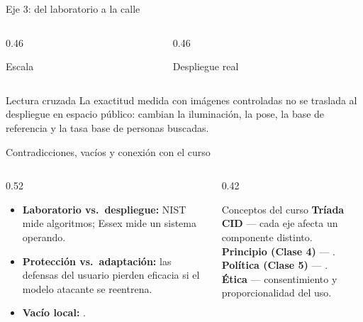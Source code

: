 \begin{frame}{Eje 3: del laboratorio a la calle}
  \begin{columns}[T]
    \begin{column}{0.46\textwidth}
      \begin{block}{Escala \cite{garvie_perpetual_2016}}
      \end{block}
    \end{column}
    \begin{column}{0.46\textwidth}
      \begin{block}{Despliegue real \cite{fussey_essex_2019}}
      \end{block}
    \end{column}
  \end{columns}

  \begin{alertblock}{Lectura cruzada}
    \scriptsize
    La exactitud medida con im\'agenes controladas no se traslada al
    despliegue en espacio p\'ublico: cambian la iluminaci\'on, la pose, la
    base de referencia y la tasa base de personas buscadas.
  \end{alertblock}
\end{frame}

\begin{frame}{Contradicciones, vac\'ios y conexi\'on con el curso}
  \begin{columns}[T]
    \begin{column}{0.52\textwidth}
      \begin{itemize}\setlength{\itemsep}{5pt}
        \item \textbf{Laboratorio vs.\ despliegue:} NIST mide algoritmos;
              Essex mide un sistema operando.
        \item \textbf{Protecci\'on vs.\ adaptaci\'on:} las defensas del
              usuario pierden eficacia si el modelo atacante se reentrena.
        \item \textbf{Vac\'io local:} .
      \end{itemize}
    \end{column}
    \begin{column}{0.42\textwidth}
      \begin{block}{Conceptos del curso}
        \scriptsize
        \textbf{Tr\'iada CID} --- cada eje afecta un componente distinto.\\[3pt]
        \textbf{Principio (Clase 4)} --- .\\[3pt]
        \textbf{Pol\'itica (Clase 5)} --- .\\[3pt]
        \textbf{\'Etica} --- consentimiento y proporcionalidad del uso.
      \end{block}
    \end{column}
  \end{columns}
\end{frame}